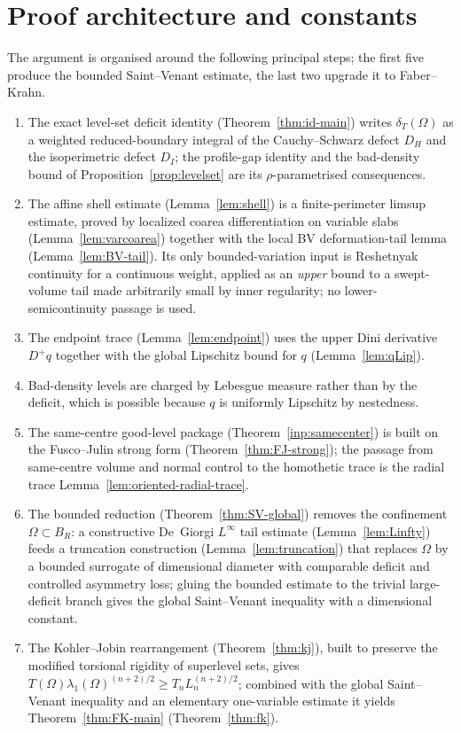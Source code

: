 \documentclass[11pt]{amsart}
\theoremstyle{definition}
\newcommand{\Om}{\Omega}
\newcommand{\dT}{\delta_T}
\begin{document}




\section{Proof architecture and constants}\label{sec:architecture}

The argument is organised around the following principal steps; the first five
produce the bounded Saint--Venant estimate, the last two upgrade it to
Faber--Krahn.
\begin{enumerate}[leftmargin=2em]
\item The exact level-set deficit identity (Theorem~\ref{thm:id-main}) writes
\(\dT(\Om)\) as a weighted reduced-boundary integral of the Cauchy--Schwarz
defect \(D_H\) and the isoperimetric defect \(D_I\); the profile-gap identity
and the bad-density bound of Proposition~\ref{prop:levelset} are its
\(\rho\)-parametrised consequences.
\item The affine shell estimate (Lemma~\ref{lem:shell}) is a finite-perimeter
limsup estimate, proved by localized coarea differentiation on variable slabs
(Lemma~\ref{lem:varcoarea}) together with the local BV deformation-tail lemma
(Lemma~\ref{lem:BV-tail}).  Its only bounded-variation input is Reshetnyak
continuity for a continuous weight, applied as an \emph{upper} bound to a
swept-volume tail made arbitrarily small by inner regularity; no
lower-semicontinuity passage is used.
\item The endpoint trace (Lemma~\ref{lem:endpoint}) uses the upper Dini
derivative \(D^+q\) together with the global Lipschitz bound for \(q\)
(Lemma~\ref{lem:qLip}).
\item Bad-density levels are charged by Lebesgue measure rather than by the
deficit, which is possible because \(q\) is uniformly Lipschitz by nestedness.
\item The same-centre good-level package (Theorem~\ref{inp:samecenter}) is built
on the Fusco--Julin strong form (Theorem~\ref{thm:FJ-strong}); the passage from
same-centre volume and normal control to the homothetic trace is the radial trace
Lemma~\ref{lem:oriented-radial-trace}.
\item The bounded reduction (Theorem~\ref{thm:SV-global}) removes the
confinement \(\Om\subset B_R\): a constructive De~Giorgi \(L^\infty\) tail
estimate (Lemma~\ref{lem:Linfty}) feeds a truncation construction
(Lemma~\ref{lem:truncation}) that replaces \(\Om\) by a bounded surrogate of
dimensional diameter with comparable deficit and controlled asymmetry loss;
gluing the bounded estimate to the trivial large-deficit branch gives the
global Saint--Venant inequality with a dimensional constant.
\item The Kohler--Jobin rearrangement (Theorem~\ref{thm:kj}), built to preserve
the modified torsional rigidity of superlevel sets, gives
\(T(\Om)\lambda_1(\Om)^{(n+2)/2}\ge T_n L_n^{(n+2)/2}\); combined with the
global Saint--Venant inequality and an elementary one-variable estimate it
yields Theorem~\ref{thm:FK-main} (Theorem~\ref{thm:fk}).
\end{enumerate}
\end{document}
